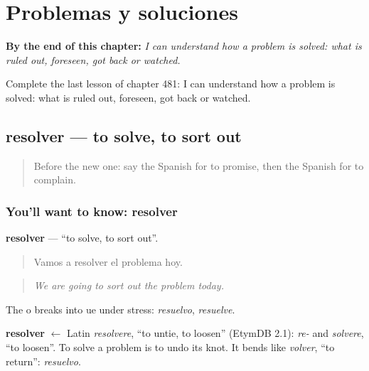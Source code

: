 
\chapter{Problemas y soluciones}
\label{ch:es-problemas-y-soluciones}

\begin{chapteropening}
\textbf{By the end of this chapter:} \emph{I can understand how a problem is solved: what is ruled out, foreseen, got back or watched.}

Complete the last lesson of chapter 481: I can understand how a problem is solved: what is ruled out, foreseen, got back or watched.
\end{chapteropening}

\section[resolver]{resolver — to solve, to sort out}

\label{lesson:ES-C481-resolver}



\begin{quote}
Before the new one: say the Spanish for to promise, then the Spanish for to complain.
\end{quote}

\subsection*{You'll want to know: resolver}
\textbf{resolver} — \textquotedblleft{}to solve, to sort out\textquotedblright{}.

\begin{quote}
Vamos a resolver el problema hoy.
\end{quote}

\begin{quote}
\emph{We are going to sort out the problem today.}
\end{quote}

The o breaks into ue under stress: \emph{resuelvo}, \emph{resuelve}.

\begin{cousinweb}
\textbf{resolver} $\leftarrow$ Latin \emph{resolvere}, \textquotedblleft{}to untie, to loosen\textquotedblright{} (EtymDB 2.1): \emph{re-} and \emph{solvere}, \textquotedblleft{}to loosen\textquotedblright{}. To solve a problem is to undo its knot. It bends like \emph{volver}, \textquotedblleft{}to return\textquotedblright{}: \emph{resuelvo}.
\end{cousinweb}

